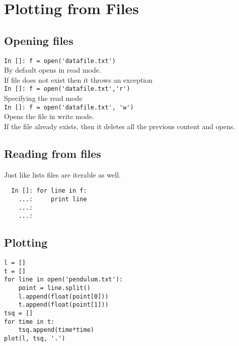 \documentclass[12pt]{article}
\newcommand{\typ}[1]{\lstinline{#1}}
\begin{document}
\section{Plotting from Files}
\subsection{Opening files}

\typ{In []: f = open('datafile.txt')}\\By default opens in read mode. \\If file does not exist then it throws an exception\\
\typ{In []: f = open('datafile.txt','r')}\\Specifying the read mode\\
\typ{In []: f = open('datafile.txt', 'w')}\\Opens the file in write mode. \\If the file already exists, then it deletes all the previous content and opens.

\subsection{Reading from files}
Just like lists files are iterable as well.

\begin{lstlisting}
  In []: for line in f:
    ...:     print line
    ...: 
    ...:
\end{lstlisting}

\subsection{Plotting}
\begin{lstlisting}
l = []
t = []
for line in open('pendulum.txt'):
    point = line.split()
    l.append(float(point[0]))
    t.append(float(point[1]))
tsq = []
for time in t:
    tsq.append(time*time)
plot(l, tsq, '.')
\end{lstlisting}
\end{document}
